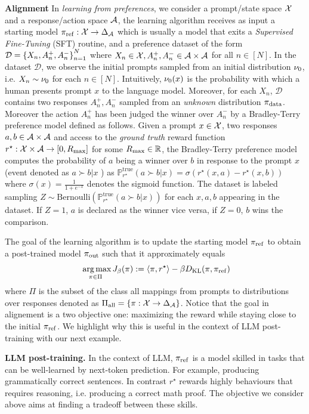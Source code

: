 \documentclass{article}
\begin{document}
\textbf{Alignment} In \emph{learning from preferences}, we consider a prompt/state space $\mathcal{X}$ and a response/action space $\mathcal{A}$, 
the learning algorithm receives as input a starting model $\pi_{\mathrm{ref}}: \mathcal{X} \rightarrow \Delta_{\mathcal{A}}$ which is usually a model that exits a \emph{Supervised Fine-Tuning} (SFT) routine, and a preference dataset of the form $\mathcal{D} = \left\{{X_n, A^+_n, A^-_n}\right\}^N_{n=1}$ where $X_n \in \mathcal{X}, A^+_n, A^-_n \in \mathcal{A}\times\mathcal{A}$ for all $n\in [N]$. In the dataset $\mathcal{D}$, we observe the initial prompts sampled from an initial distribution $\nu_0$, i.e. $X_n \sim \nu_0$ for each $n \in [N]$. Intuitively, $\nu_0(x)$ is the probability with which a human presents prompt $x$ to the language model.
Moreover, for each $X_n$, $\mathcal{D}$ contains two responses $A^+_n, A^-_n$ sampled from an \emph{unknown} distribution $\pi_{\mathrm{data}}$. 
Moreover the action $A^+_n$ has been judged the winner over $A^-_n$ by a Bradley-Terry preference model defined as follows.
Given  a prompt $x\in \mathcal{X}$, two responses $a,b \in \mathcal{A}\times\mathcal{A}$ and access to the \emph{ground truth} reward function $r^\star :\mathcal{X}\times\mathcal{A} \rightarrow [0, R_{\max}] $ for some $R_{\max} \in \mathbb{R}$, the Bradley-Terry preference model computes the probability of $a$ being a winner over $b$  in response to the prompt $x$ (event denoted as $a \succ b | x$ ) as $
\mathbb{P}^\mathrm{true}_{r^\star}(a\succ b | x) = \sigma(r^\star(x,a) - r^\star(x,b))$
where $\sigma(x) = \frac{1}{1 + e^{-x}}$ denotes the sigmoid function. 
The dataset is labeled sampling $Z \sim \mathrm{Bernoulli}(\mathbb{P}^\mathrm{true}_{r^\star}(a\succ b | x))$ for each $x,a,b$ appearing in the dataset. If $Z=1$, $a$ is declared as the winner vice versa, if $Z=0$, $b$ wins the comparison.

The goal of the learning algorithm is to update the starting model $\pi_{\mathrm{ref}}$ to obtain a post-trained model $\pi_{\mathrm{out}}$ such that it approximately equals
\begin{equation}
\label{eq:PEPOgoal}
\mathop{\mbox{ arg\,max}}_{\pi\in\Pi} J_\beta(\pi) := \left\langle{\pi},{r^\star}\right\rangle - \beta D_{\mathrm{KL}}(\pi,\pi_{\mathrm{ref}})
\end{equation}
where $\Pi$ is the subset of the class all mappings from prompts to distributions over responses denoted as $\Pi_{\mathrm{all}} = \left\{{\pi: \mathcal{X}\rightarrow\Delta_{\mathcal{A}}}\right\}$. Notice that the goal in alignement is a two objective one: maximizing the reward while staying close to the initial $\pi_{\mathrm{ref}}$. We highlight why this is useful in the context of LLM post-training with our next example.
\begin{example}
\textbf{LLM post-training.} In the context of LLM, $\pi_{\mathrm{ref}}$ is a model skilled in tasks that can be well-learned by next-token prediction. For example, producing grammatically correct sentences.
In contrast $r^\star$ rewards highly behaviours that requires reasoning, i.e. producing a correct math proof. The objective we consider above aims at finding a tradeoff between these skills.
\end{example}
\end{document}
